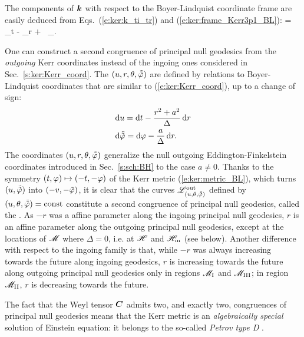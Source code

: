 The components of $\bm{k}$ with respect to the Boyer-Lindquist coordinate frame
are easily deduced from Eqs.~(\ref{e:ker:k_ti_tr}) and (\ref{e:ker:frame_Kerr3p1_BL}):
\be \label{e:ker:k_BL}
     =  \, \wpar_t
        - \wpar_r +  \, \wpar_\ph .
\ee


One can construct a second congruence of principal null geodesics from
the \emph{outgoing} Kerr coordinates instead of the ingoing ones
considered in Sec.~\ref{s:ker:Kerr_coord}. The 
$(u,r,\theta,\tilde{{\tilde\varphi}})$ are defined by relations to Boyer-Lindquist
coordinates that are similar to
(\ref{e:ker:Kerr_coord}), up to a change of sign:
\begin{subequations}
\label{e:ker:out_Kerr_coord}
\begin{align}
& \mathrm{d} u = \mathrm{d} t - \frac{r^2+a^2}{\Delta} \, \mathrm{d} r \\
& \mathrm{d} \tilde{{\tilde\varphi}} = \mathrm{d} \varphi - \frac{a}{\Delta}\, \mathrm{d} r .
\end{align}
\end{subequations}
The coordinates $(u,r,\theta,\tilde{{\tilde\varphi}})$ generalize the null
outgoing Eddington-Finkelstein
coordinates introduced in Sec.~\ref{s:sch:BH} to the case $a\not=0$.
Thanks to the symmetry $(t,\varphi)\mapsto(-t,-\varphi)$ of the Kerr metric (\ref{e:ker:metric_BL}), which turns $(u,\tilde{{\tilde\varphi}})$ into $(-v,-{\tilde\varphi})$, it is clear that the curves $\mathscr{L}^{\rm out}_{(u,\theta,\tilde{{\tilde\varphi}})}$
defined by $(u,\theta,\tilde{{\tilde\varphi}})=\mathrm{const}$ constitute a second
congruence of principal null geodesics, called the . As $-r$ was a affine parameter along
the ingoing principal null geodesics, $r$ is an affine parameter along
the outgoing principal null geodesics,
 except at the locations of $\mathscr{M}$ where $\Delta=0$,
i.e. at $\mathscr{H}$ and $\mathscr{H}_{\rm in}$ (see below). Another difference
with respect to the ingoing family is that, while $-r$ was always
increasing towards the future along ingoing geodesics,
 $r$ is increasing towards the future
along outgoing principal null geodesics only in regions
$\mathscr{M}_{\rm I}$ and $\mathscr{M}_{\rm III}$; in region $\mathscr{M}_{\rm II}$,
$r$ is decreasing towards the future.

The fact that the Weyl tensor $\bm{C}$
admits two, and exactly two, congruences of principal null geodesics
means that the Kerr metric is an \emph{algebraically special} solution of
Einstein equation: it belongs to the so-called \emph{Petrov type D}
\cite{ONeil95}.

